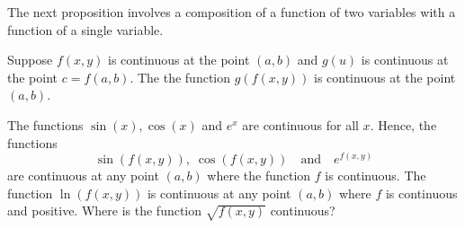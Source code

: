 \documentclass[handout]{ximera}
\begin{document}
The next proposition involves a composition of a function of two variables with a function of a single variable.

\begin{proposition}
Suppose $f(x,y)$ is continuous at the point $(a,b)$ and $g(u)$ is continuous at the point $ c = f(a,b)$.
The the function $g(f(x,y))$ is continuous at the point $(a,b)$.
\end{proposition}

The functions $\sin(x), \cos(x)$ and $e^x$ are continuous for all $x$.  Hence, the functions
\[
\sin(f(x,y)),\; \cos(f(x,y)) \quad \text{and} \quad e^{f(x,y)}
\]
are continuous at any point $(a,b)$ where the function $f$ is continuous. 
The function $\ln(f(x,y))$ is continuous at any point $(a,b)$ where $f$ is continuous and positive.
Where is the function $\sqrt{f(x,y)}$ continuous?
\end{document}
